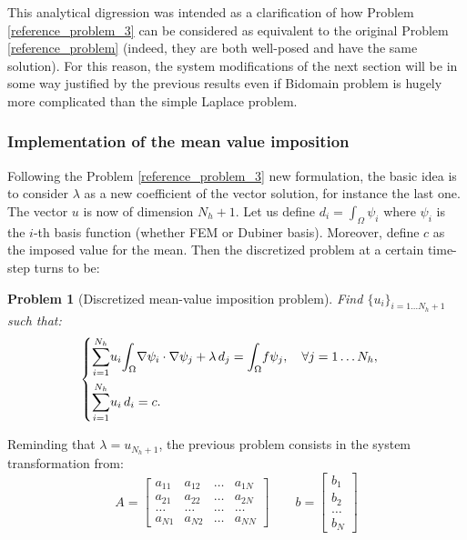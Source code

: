 \documentclass[a4paper,11pt]{article}
\newtheorem{problem}{Problem}
\begin{document}
	\vspace{3mm} 
	\noindent This analytical digression was intended as a clarification of how Problem \ref{reference_problem_3} can be considered as equivalent to the original Problem \ref{reference_problem} (indeed, they are both well-posed and have the same solution). For this reason, the system modifications of the next section will be in some way justified by the previous results even if Bidomain problem is hugely more complicated than the simple Laplace problem.


\subsubsection{Implementation of the mean value imposition} \label{mean_value_implementation}
\noindent Following the Problem \ref{reference_problem_3} new formulation, the basic idea is to consider $\lambda$ as a new coefficient of the vector solution, for instance the last one. The vector $u$ is now of dimension $N_h+1$. Let us define $d_i=\int_\Omega \psi_i$ where $\psi_i$ is the $i$-th basis function (whether FEM or Dubiner basis). Moreover, define $c$ as the imposed value for the mean. Then the discretized problem at a certain time-step turns to be:

\begin{problem}[Discretized mean-value imposition problem]
	Find $\{u_i\}_{i=1\dots N_h+1}$ such that:
	\begin{equation*}
	\begin{cases}
	\mathlarger{\sum}_{i=1}^{N_h} u_i \mathlarger{\int}_{\Omega}\nabla\psi_i \cdot \nabla \psi_j + \lambda \,d_j=\mathlarger{\int}_{\Omega}f\psi_j, \quad \forall j=1\dots N_h, \\[3ex]
	\mathlarger{\sum}_{i=1}^{N_h} u_i \,d_i = c.
	\end{cases}
	\end{equation*}
\end{problem}
\vspace{3mm}
\noindent Reminding that $\lambda=u_{N_h+1}$, the previous problem consists in the system transformation from: \\
\begin{equation*}
A=\begin{bmatrix}
a_{11} & a_{12} & \dots & a_{1N} \\ 
a_{21} & a_{22} & \dots & a_{2N} \\ 
\dots & \dots & \dots & \dots \\
a_{N1}  & a_{N2} & \dots & a_{NN}
\end{bmatrix} \quad \quad
b=\begin{bmatrix}
b_1 \\ b_2 \\ \dots \\ b_N
\end{bmatrix}
\end{equation*}
\end{document}
